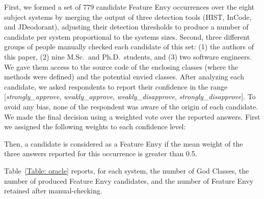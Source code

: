 First, we formed a set of 779 candidate Feature Envy occurrences over the eight subject systems by merging the output of three detection tools (HIST, InCode, and JDeodorant), adjusting their detection thresholds to produce a number of candidate per system proportional to the systems sizes. Second, three different groups of people manually checked each candidate of this set: (1) the authors of this paper, (2) nine M.Sc.\ and Ph.D.\ students, and (3) two software engineers. We gave them access to the source code of the enclosing classes (where the methods were defined) and the potential envied classes. After analyzing each candidate, we asked respondents to report their confidence in the range [\textit{strongly\_approve}, \textit{weakly\_approve}, \textit{weakly\_disapprove}, \textit{strongly\_disapprove}]. To avoid any bias, none of the respondent was aware of the origin of each candidate. We made the final decision using a weighted vote over the reported answers. First we assigned the following weights to each confidence level:
\begin{center}
\end{center}

Then, a candidate is considered as a Feature Envy if the mean weight of the three answers reported for this occurrence is greater than 0.5.

Table~\ref{Table: oracle} reports, for each system, the number of God Classes, the number of produced Feature Envy candidates, and the number of Feature Envy retained after manual-checking.

\begin{table}[htb]
\caption{Characteristics of the Oracle}
\label{Table: oracle}
\end{table}

